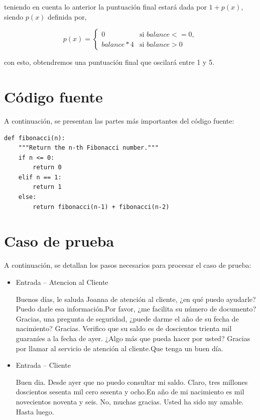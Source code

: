 \documentclass[10pt,times,twocolumn]{article}
\begin{document}
teniendo en cuenta lo anterior la puntuación final estará dada por \(1 + p(x)\), siendo \(p(x)\) definida por,

\[
p(x) =
\begin{cases}
0 & \text{si } balance <= 0, \\
balance*4 & \text{si } balance > 0
\end{cases}
\]

con esto, obtendremos una puntuación final que oscilará entre 1 y 5.

\section{Código fuente}

A continuación, se presentan las partes más importantes del código fuente:


\begin{lstlisting}[caption={Ejemplo de código en Python}]
def fibonacci(n):
    """Return the n-th Fibonacci number."""
    if n <= 0:
        return 0
    elif n == 1:
        return 1
    else:
        return fibonacci(n-1) + fibonacci(n-2)
\end{lstlisting}

\section{Caso de prueba}
A continuación, se detallan los pasos necesarios para procesar el caso de prueba:

\begin{itemize}

	\item Entrada – Atencion al Cliente
	
Buenos días, le saluda Joanna de atención al cliente, ¿en qué puedo ayudarle?
Puedo darle esa información.Por favor, ¿me facilita su número de documento?
Gracias, una pregunta de seguridad, ¿puede darme el año de su fecha de
nacimiento?
Gracias. Verifico que su saldo es de doscientos trienta mil guaraníes a la fecha de
ayer. ¿Algo más que pueda hacer por usted?
Gracias por llamar al servicio de atención al cliente.Que tenga un buen día.

	\item Entrada – Cliente
	
Buen dia. Desde ayer que no puedo consultar mi saldo.
Claro, tres millones doscientos sesenta mil cero sesenta y ocho.En año de mi nacimiento es mil novecientos noventa y seis.
No, muchas gracias. Usted ha sido my amable.
Hasta luego.

\end{itemize}
\end{document}
